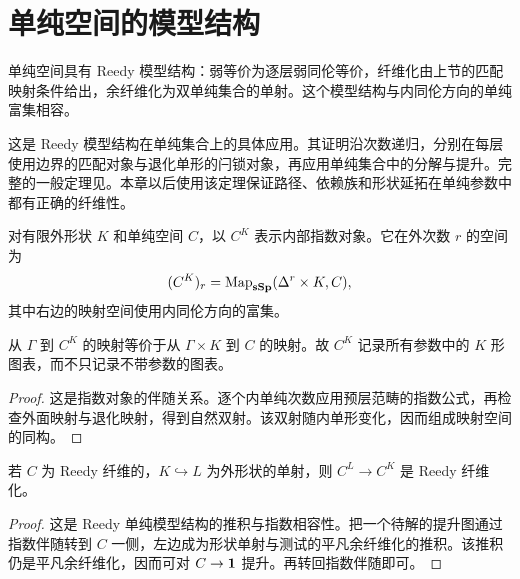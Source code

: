 \section{单纯空间的模型结构}
\begin{theorem}
单纯空间具有 Reedy 模型结构：弱等价为逐层弱同伦等价，纤维化由上节的匹配映射条件给出，余纤维化为双单纯集合的单射。这个模型结构与内同伦方向的单纯富集相容。
\end{theorem}
\begin{remark}
这是 Reedy 模型结构在单纯集合上的具体应用。其证明沿次数递归，分别在每层使用边界的匹配对象与退化单形的闩锁对象，再应用单纯集合中的分解与提升。完整的一般定理见\cite{RiehlCatHomotopy,GoerssJardine}。本章以后使用该定理保证路径、依赖族和形状延拓在单纯参数中都有正确的纤维性。
\end{remark}
\begin{definition}[形状上的映射对象]
对有限外形状 $K$ 和单纯空间 $C$，以 $C^K$ 表示内部指数对象。它在外次数 $r$ 的空间为
\[
(C^K)_r=\operatorname{Map}_{\mathbf{sSp}}(\Delta^r\times K,C),
\]
其中右边的映射空间使用内同伦方向的富集。
\end{definition}
\begin{proposition}[带参数的形状图表]
从 $\Gamma$ 到 $C^K$ 的映射等价于从 $\Gamma\times K$ 到 $C$ 的映射。故 $C^K$ 记录所有参数中的 $K$ 形图表，而不只记录不带参数的图表。
\end{proposition}
\begin{proof}
这是指数对象的伴随关系。逐个内单纯次数应用预层范畴的指数公式，再检查外面映射与退化映射，得到自然双射。该双射随内单形变化，因而组成映射空间的同构。
\end{proof}
\begin{proposition}[限制映射的纤维性]
若 $C$ 为 Reedy 纤维的，$K\hookrightarrow L$ 为外形状的单射，则 $C^L\to C^K$ 是 Reedy 纤维化。
\end{proposition}
\begin{proof}
这是 Reedy 单纯模型结构的推积与指数相容性。把一个待解的提升图通过指数伴随转到 $C$ 一侧，左边成为形状单射与测试的平凡余纤维化的推积。该推积仍是平凡余纤维化，因而可对 $C\to\mathbf 1$ 提升。再转回指数伴随即可。
\end{proof}

